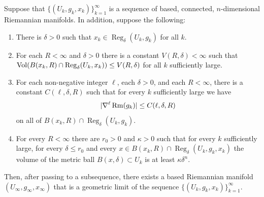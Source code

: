 \begin{theorem}\label{thm:geometric-limit-existence}

\label{basicconv}

Suppose that $\{(U_k,g_k,x_k)\}_{k=1}^\infty$ is a sequence of
based, connected, $n$-dimensional Riemannian manifolds. In addition,
suppose the following:

\begin{enumerate}
\item[(1)] There is $\delta>0$ such that $x_k\in \operatorname{Reg}_\delta(U_k,g_k)$ for all $k$.
\item[(2)] For each $R<\infty$ and $\delta>0$ there is a constant $V(R,\delta)<\infty$ such
that $\operatorname{Vol}(B(x_k,R)\cap \operatorname{Reg}_\delta(U_k,x_k))\le
V(R,\delta)$ for all $k$ sufficiently large.
\item[(3)] For each non-negative integer $\ell$, each $\delta>0$, and each $R<\infty$,
 there is a constant
$C(\ell,\delta,R)$ such that for every $k$ sufficiently large we
have
$$|\nabla^\ell \operatorname{Rm}(g_k)|\le C(\ell,\delta,R)$$
on all of $B(x_k,R)\cap\operatorname{Reg}_\delta(U_k,g_k)$.
\item[(4)] For every $R<\infty$ there are $r_0>0$ and $\kappa>0$ such that
for every $k$ sufficiently large, for every $\delta\le r_0$ and
every $x\in B(x_k,R)\cap \operatorname{Reg}_\delta(U_k,g_k,x_k)$ the volume
of the metric ball $B(x,\delta)\subset U_k$ is at least
$\kappa\delta^n$.
\end{enumerate}
Then, after passing to a subsequence, there exists a based
Riemannian manifold $(U_\infty,g_\infty,x_\infty)$ that is a
geometric limit of the sequence $\{(U_k,g_k,x_k)\}_{k=1}^\infty$.
\end{theorem}



